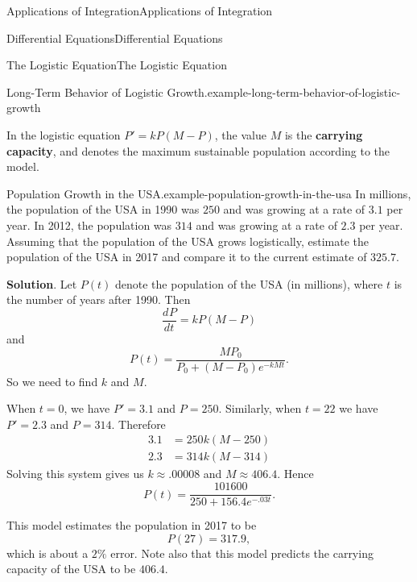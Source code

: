 \documentclass[10pt,]{book}
\newcommand{\terminology}[1]{\textbf{#1}}
\numberwithin{equation}{section}
\newcommand{\dv}[3][]{\dfrac{d^{#1} #2}{d #3^{#1}}}
\begin{document}
\begin{chapterptx}{Applications of Integration}{}{Applications of Integration}{}{}
\begin{sectionptx}{Differential Equations}{}{Differential Equations}{}{}
\begin{subsectionptx}{The Logistic Equation}{}{The Logistic Equation}{}{}
\begin{example}{Long-Term Behavior of Logistic Growth.}{example-long-term-behavior-of-logistic-growth}
\end{example}
\hypertarget{p-747}{}%
In the logistic equation \(P' = kP(M-P)\), the value \(M\) is the \terminology{carrying capacity}, and denotes the maximum sustainable population according to the model.%
\begin{example}{Population Growth in the USA.}{example-population-growth-in-the-usa}%
\hypertarget{p-748}{}%
In millions, the population of the USA in 1990 was \(250\) and was growing at a rate of \(3.1\) per year. In 2012, the population was \(314\) and was growing at a rate of \(2.3\) per year. Assuming that the population of the USA grows logistically, estimate the population of the USA in 2017 and compare it to the current estimate of \(325.7\).%
\par\smallskip%
\noindent\textbf{Solution}.\hypertarget{solution-157}{}\quad%
\hypertarget{p-749}{}%
Let \(P(t)\) denote the population of the USA (in millions), where \(t\) is the number of years after 1990. Then%
\begin{equation*}
\dv{P}{t} = kP(M-P)
\end{equation*}
and%
\begin{equation*}
P(t) = \frac{MP_{0}}{P_{0} + (M - P_{0})e^{-kMt}}.
\end{equation*}
So we need to find \(k\) and \(M\).%
\par
\hypertarget{p-750}{}%
When \(t = 0\), we have \(P' = 3.1\) and \(P = 250\). Similarly, when \(t = 22\) we have \(P' = 2.3\) and \(P = 314\). Therefore%
\begin{align*}
3.1 & = 250k(M - 250) \\
2.3 & = 314k(M - 314) 
\end{align*}
Solving this system gives us \(k\approx.00008\) and \(M \approx 406.4\). Hence%
\begin{equation*}
P(t) = \frac{101600}{250 + 156.4e^{-.03t}}.
\end{equation*}
%
\par
\hypertarget{p-751}{}%
This model estimates the population in 2017 to be%
\begin{equation*}
P(27) = 317.9,
\end{equation*}
which is about a \(2\%\) error. Note also that this model predicts the carrying capacity of the USA to be \(406.4\).%
\end{example}
\end{subsectionptx}
%
%
\typeout{************************************************}
\typeout{************************************************}

\end{sectionptx}
\end{chapterptx}
\end{document}
